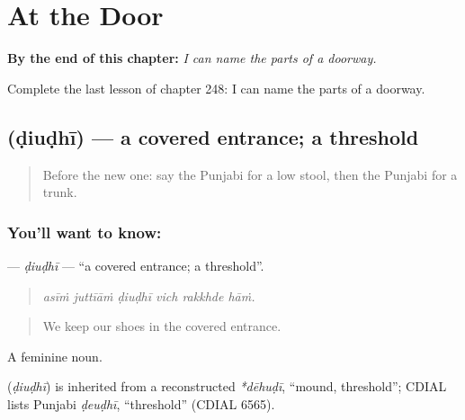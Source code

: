 
\chapter{At the Door}
\label{ch:pa-a2-at-the-door}

\begin{chapteropening}
\textbf{By the end of this chapter:} \emph{I can name the parts of a doorway.}

Complete the last lesson of chapter 248: I can name the parts of a doorway.
\end{chapteropening}

\section[\texorpdfstring{\pa{ਡਿਉਢੀ} (ḍiuḍhī)}{ਡਿਉਢੀ (ḍiuḍhī)}]{ (ḍiuḍhī) — a covered entrance; a threshold}

\label{lesson:PA-C248-diudhi}



\begin{quote}
Before the new one: say the Punjabi for a low stool, then the Punjabi for a trunk.
\end{quote}

\subsection*{You'll want to know: }
\textbf{} — \emph{ḍiuḍhī} — \textquotedblleft{}a covered entrance; a threshold\textquotedblright{}.

\begin{quote}
     
\end{quote}

\begin{quote}
\emph{asīṁ juttīāṁ ḍiuḍhī vich rakkhde hāṁ.}
\end{quote}

\begin{quote}
We keep our shoes in the covered entrance.
\end{quote}

A feminine noun.

\begin{cousinweb}
\textbf{} (\emph{ḍiuḍhī}) is inherited from a reconstructed \emph{*dēhuḍī}, \textquotedblleft{}mound, threshold\textquotedblright{}; CDIAL lists Punjabi \emph{ḍeuḍhī}, \textquotedblleft{}threshold\textquotedblright{} (CDIAL 6565).
\end{cousinweb}

